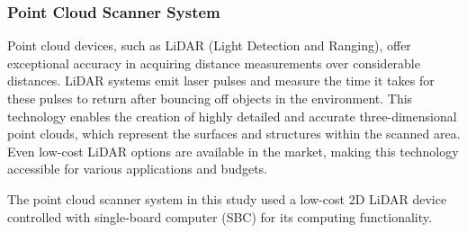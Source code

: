 



\subsubsection{Point Cloud Scanner System}

Point cloud devices, such as LiDAR (Light Detection and Ranging), offer exceptional accuracy in acquiring distance measurements over considerable distances. LiDAR systems emit laser pulses and measure the time it takes for these pulses to return after bouncing off objects in the environment. This technology enables the creation of highly detailed and accurate three-dimensional point clouds, which represent the surfaces and structures within the scanned area. Even low-cost LiDAR options are available in the market, making this technology accessible for various applications and budgets.

The point cloud scanner system in this study used a low-cost 2D LiDAR device controlled with single-board computer (SBC) for its computing functionality.

